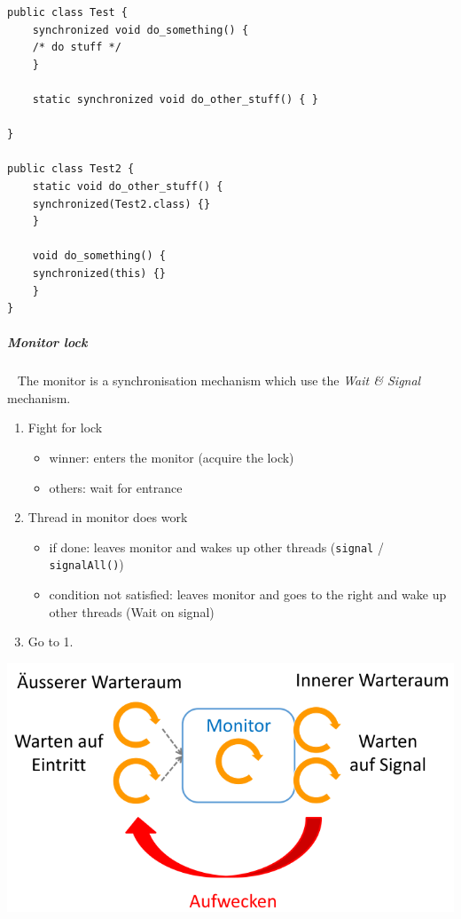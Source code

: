 \documentclass[11pt,twoside,landscape]{article}
\begin{document}
\begin{multicols}{3}
\lstset{language=java,label= ,caption= ,captionpos=b,numbers=none}
\begin{lstlisting}
public class Test {
    synchronized void do_something() {
	/* do stuff */
    }

    static synchronized void do_other_stuff() { }

}

public class Test2 {
    static void do_other_stuff() {
	synchronized(Test2.class) {}
    }

    void do_something() {
	synchronized(this) {}
    }
}
\end{lstlisting}

\subparagraph{Monitor lock} \
\label{sec:org2ee2ab8}
The monitor is a synchronisation mechanism which use the \emph{Wait \& Signal} mechanism.

\begin{enumerate}
\item Fight for lock
\begin{itemize}
\item winner: enters the monitor (acquire the lock)
\item others: wait for entrance
\end{itemize}
\item Thread in monitor does work
\begin{itemize}
\item if done: leaves monitor and wakes up other threads (\texttt{signal} / \texttt{signalAll()})
\item condition not satisfied: leaves monitor and goes to the right and wake up other threads (Wait on signal)
\end{itemize}
\item Go to 1.
\end{enumerate}


{
\begin{center}
\includegraphics[width=.9\linewidth]{img/monitor.png}
\end{center}
\label{fig:monitor}
}


\end{multicols}
\end{document}
